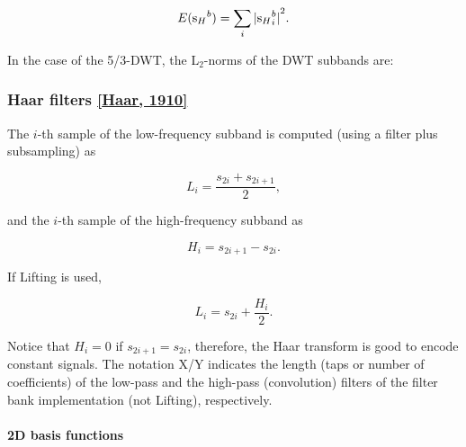 \begin{equation}
  E({{\text s}_H}^b) = \sum_i{|{{\text s}_H}^b_i|}^2.
\end{equation}

In the case of the 5/3-DWT, the L\(_2\)-norms of the DWT subbands are:

    \hypertarget{haar-filters-haar-1910}{%
\subsubsection{\texorpdfstring{Haar filters
\href{https://scholar.google.es/scholar?hl=es\&as_sdt=0\%2C5\&q=A.+Haar.+Zur+Theorie+der+orthogolanen+Funktionen-Systeme.+Mathematische+Annalen\%2C+69\%3A331\%E2\%80\%93371\%2C+1910\&btnG=}{{[}Haar,
1910{]}}}{Haar filters {[}Haar, 1910{]}}}\label{haar-filters-haar-1910}}

The \(i\)-th sample of the low-frequency subband is computed (using a
filter plus subsampling) as

\begin{equation}
  L_i=\frac{s_{2i}+s_{2i+1}}{2},
  \tag{HaarL}
  \label{eq:Haar_A-LPF}
\end{equation}

and the \(i\)-th sample of the high-frequency subband as

\begin{equation}
  H_i=s_{2i+1}-s_{2i}.
  \tag{HaarH}
  \label{eq:Haar_A-HPF}
\end{equation}

If Lifting is used,

\begin{equation}
  L_i=s_{2i}+\frac{H_i}{2}.
  \tag{HaarLLifted}
  \label{eq:Haar_A-LPF-lifting}
\end{equation}

Notice that \(H_i=0\) if \(s_{2i+1}=s_{2i}\), therefore, the Haar
transform is good to encode constant signals. The notation X/Y indicates
the length (taps or number of coefficients) of the low-pass and the
high-pass (convolution) filters of the filter bank implementation (not
Lifting), respectively.

    \hypertarget{d-basis-functions}{%
\paragraph{2D basis functions}\label{d-basis-functions}}


